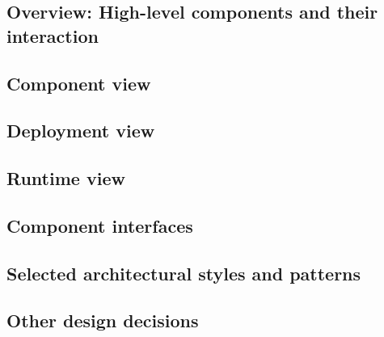 \documentclass[../main.tex]{subfiles}
\begin{document}
\subsection{Overview: High-level components and their interaction}

\subsection{Component view}

\subsection{Deployment view}

\subsection{Runtime view}

\subsection{Component interfaces}

\subsection{Selected architectural styles and patterns}

\subsection{Other design decisions}
\end{document}

